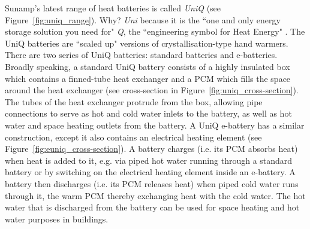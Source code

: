 Sunamp's latest range of heat batteries is called \emph{UniQ} (see Figure~\ref{fig:uniq_range}).
Why?
\emph{Uni} because it is the ``one and only energy storage solution you need for" \emph{Q}, the ``engineering symbol for Heat Energy" \citep{UniQ_Leaflet}.
The UniQ batteries are ``scaled up" versions of crystallisation-type hand warmers.
There are two series of UniQ batteries: standard batteries and e-batteries.
Broadly speaking, a standard UniQ battery consists of a highly insulated box which contains a finned-tube heat exchanger and a PCM which fills the space around the heat exchanger (see cross-section in Figure~\ref{fig:uniq_cross-section}).
The tubes of the heat exchanger protrude from the box, allowing pipe connections to serve as hot and cold water inlets to the battery, as well as hot water and space heating outlets from the battery.
A UniQ e-battery has a similar construction, except it also contains an electrical heating element (see Figure~\ref{fig:euniq_cross-section}).
A battery charges (i.e. its PCM absorbs heat) when heat is added to it, e.g. via piped hot water running through a standard battery or by switching on the electrical heating element inside an e-battery.
A battery then discharges (i.e. its PCM releases heat) when piped cold water runs through it, the warm PCM thereby exchanging heat with the cold water.
The hot water that is discharged from the battery can be used for space heating and hot water purposes in buildings.


